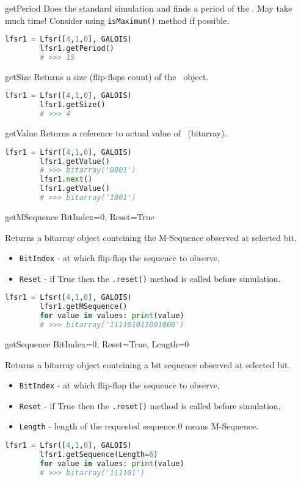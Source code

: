  {getPeriod} {} {
	Does the standard simulation and finds a period of the \Lfsr. May take much time! Consider using \texttt{isMaximum()} method if possible.
}
\begin{lstlisting}[language=Python]
		lfsr1 = Lfsr([4,1,0], GALOIS)
		lfsr1.getPeriod()
		# >>> 15
\end{lstlisting}

 {getSize} {} {
	Returns a size (flip-flops count) of the \Lfsr\ object.
}
\begin{lstlisting}[language=Python]
		lfsr1 = Lfsr([4,1,0], GALOIS)
		lfsr1.getSize()
		# >>> 4
\end{lstlisting}

 {getValue} {} {
	Returns a reference to actual value of \Lfsr\ (bitarray).
}
\begin{lstlisting}[language=Python]
		lfsr1 = Lfsr([4,1,0], GALOIS)
		lfsr1.getValue()
		# >>> bitarray('0001')
		lfsr1.next()
		lfsr1.getValue()
		# >>> bitarray('1001')
\end{lstlisting}

 {getMSequence} {BitIndex=0, Reset=True} {
	Returns a bitarray object conteining the M-Sequence observed at selected bit.
	\begin{itemize}
		\item \texttt{BitIndex} - at which flip-flop the sequence to observe,
		\item \texttt{Reset} - if True then the \texttt{.reset()} method is called before simulation.
	\end{itemize}
}
\begin{lstlisting}[language=Python]
		lfsr1 = Lfsr([4,1,0], GALOIS)
		lfsr1.getMSequence()
		for value in values: print(value)
		# >>> bitarray('111101011001000')
\end{lstlisting}

 {getSequence} {BitIndex=0, Reset=True, Length=0} {
	Returns a bitarray object conteining a bit sequence observed at selected bit.
	\begin{itemize}
		\item \texttt{BitIndex} - at which flip-flop the sequence to observe,
		\item \texttt{Reset} - if True then the \texttt{.reset()} method is called before simulation,
		\item \texttt{Length} - length of the requested sequence.0 means M-Sequence.
	\end{itemize}
}
\begin{lstlisting}[language=Python]
		lfsr1 = Lfsr([4,1,0], GALOIS)
		lfsr1.getSequence(Length=6)
		for value in values: print(value)
		# >>> bitarray('111101')
\end{lstlisting}

